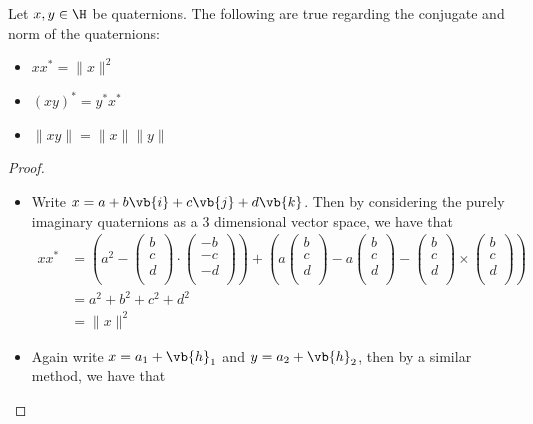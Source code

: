 \documentclass[a4paper]{article}
\begin{document}
\begin{prp}{}{} Let $x,y\in\H$ be quaternions. The following are true regarding the conjugate and norm of the quaternions: 
\begin{itemize}
\item $xx^\ast=\|x\|^2$
\item $(xy)^\ast=y^\ast x^\ast$
\item $\|xy\|=\|x\|\|y\|$
\end{itemize} 
\begin{proof}~\\
\begin{itemize}
\item Write $x=a+b\vb{i}+c\vb{j}+d\vb{k}$. Then by considering the purely imaginary quaternions as a $3$ dimensional vector space, we have that 
\begin{align*}
xx^\ast&=\left(a^2-\begin{pmatrix}
b\\c\\d\\\end{pmatrix}\cdot\begin{pmatrix}-b\\-c\\-d\\\end{pmatrix}\right)+\left(a\begin{pmatrix}b\\c\\d\\\end{pmatrix}-a\begin{pmatrix}b\\c\\d\\\end{pmatrix}-\begin{pmatrix}b\\c\\d\\\end{pmatrix}\times\begin{pmatrix}b\\c\\d\\\end{pmatrix}\right)\\
&=a^2+b^2+c^2+d^2\\
&=\|x\|^2
\end{align*}
\item Again write $x=a_1+\vb{h}_1$ and $y=a_2+\vb{h}_2$, then by a similar method, we have that 

\end{itemize}
\end{proof}
\end{prp}
\end{document}
